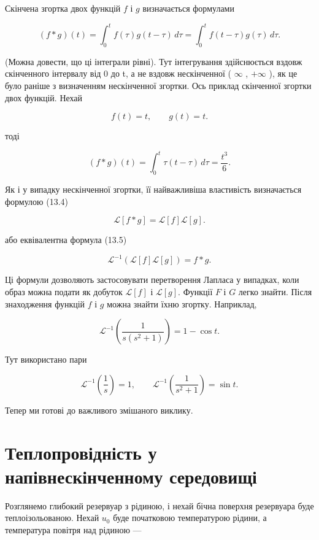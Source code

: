 \documentclass[
  ukrainian,
]{article}
\begin{document}
Скінчена згортка двох функцій \(f\) і \(g\) визначається формулами

\[
(f * g)(t)
= \int_0^t f(\tau)g(t-\tau)\,d\tau
= \int_0^t f(t-\tau)g(\tau)\,d\tau.
\]

(Можна довести, що ці інтеграли рівні). Тут інтегрування здійснюється
вздовж скінченного інтервалу від 0 до t, а не вздовж нескінченної (
\(\infty\) , \(+\infty\) ), як це було раніше з визначенням нескінченної
згортки. Ось приклад скінченної згортки двох функцій. Нехай

\[
f(t)=t,\qquad g(t)=t.
\]

тоді

\[
(f * g)(t)=\int_0^t \tau(t-\tau)\,d\tau=\frac{t^3}{6}.
\]

Як і у випадку нескінченної згортки, її найважливіша властивість
визначається формулою (13.4)

\[
\mathcal{L}[f*g]=\mathcal{L}[f]\mathcal{L}[g].
\]

або еквівалентна формула (13.5)

\[
\mathcal{L}^{-1}\!\left(\mathcal{L}[f]\mathcal{L}[g]\right)=f*g.
\]

Ці формули дозволяють застосовувати перетворення Лапласа у випадках,
коли образ можна подати як добуток \(\mathcal{L}[f]\) і
\(\mathcal{L}[g]\). Функції \(F\) і \(G\) легко знайти. Після
знаходження функцій \(f\) і \(g\) можна знайти їхню згортку. Наприклад,

\[
\mathcal{L}^{-1}\!\left(\frac{1}{s(s^2+1)}\right)=1-\cos t.
\]

Тут використано пари

\[
\mathcal{L}^{-1}\!\left(\frac{1}{s}\right)=1,\qquad
\mathcal{L}^{-1}\!\left(\frac{1}{s^2+1}\right)=\sin t.
\]

Тепер ми готові до важливого змішаного виклику.

\section{Теплопровідність у напівнескінченному
середовищі}\label{ux442ux435ux43fux43bux43eux43fux440ux43eux432ux456ux434ux43dux456ux441ux442ux44c-ux443-ux43dux430ux43fux456ux432ux43dux435ux441ux43aux456ux43dux447ux435ux43dux43dux43eux43cux443-ux441ux435ux440ux435ux434ux43eux432ux438ux449ux456}

Розглянемо глибокий резервуар з рідиною, і нехай бічна поверхня
резервуара буде теплоізольованою. Нехай \(u_0\) буде початковою
температурою рідини, а температура повітря над рідиною ---
\end{document}
